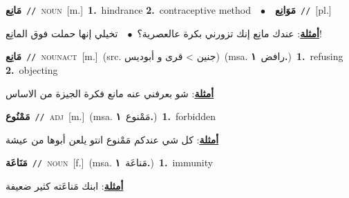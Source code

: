 \documentclass[10pt,a4paper,twoside]{article} %
\begin{document}
\begin{multicols}{2}
{\setlength\topsep{0pt}\textbf{\foreignlanguage{arabic}{مَانِع}}\ {\color{gray}\texttt{//}\color{black}}\ \textsc{noun}\ [m.]\ \textbf{1.}~hindrance  \textbf{2.}~contraceptive method\ \ $\bullet$\ \ \setlength\topsep{0pt}\textbf{\foreignlanguage{arabic}{مَوَانِع}}\ {\color{gray}\texttt{//}\color{black}}\ [pl.]\  \begin{flushright}\color{gray}\foreignlanguage{arabic}{\textbf{\underline{\foreignlanguage{arabic}{أمثلة}}}: عندك مانِع إنك تزورني بكرة عالعصرية؟\ $\bullet$\ \  تخيلي إنها حملت فوق المانِع!}\end{flushright}\color{black}} \vspace{2mm}

{\setlength\topsep{0pt}\textbf{\foreignlanguage{arabic}{مَانِع}}\ {\color{gray}\texttt{//}\color{black}}\ \textsc{noun\textunderscore act}\ [m.]\ (src. \color{gray}\foreignlanguage{arabic}{جنين > قرى و أبوديس}\color{black})\ \color{gray}(msa. \foreignlanguage{arabic}{رافض}~\foreignlanguage{arabic}{\textbf{١.}})\color{black}\ \textbf{1.}~refusing  \textbf{2.}~objecting\  \begin{flushright}\color{gray}\foreignlanguage{arabic}{\textbf{\underline{\foreignlanguage{arabic}{أمثلة}}}: شو بعرفني عنه مانع فكرة الجيزة من الاساس}\end{flushright}\color{black}} \vspace{2mm}

{\setlength\topsep{0pt}\textbf{\foreignlanguage{arabic}{مَمْنُوع}}\ {\color{gray}\texttt{//}\color{black}}\ \textsc{adj}\ [m.]\ \color{gray}(msa. \foreignlanguage{arabic}{مَمْنوع}~\foreignlanguage{arabic}{\textbf{١.}})\color{black}\ \textbf{1.}~forbidden\  \begin{flushright}\color{gray}\foreignlanguage{arabic}{\textbf{\underline{\foreignlanguage{arabic}{أمثلة}}}: كل شي عندكم مَمْنوع انتو يلعن أبوها من عيشة}\end{flushright}\color{black}} \vspace{2mm}

{\setlength\topsep{0pt}\textbf{\foreignlanguage{arabic}{مَنَاعَة}}\ {\color{gray}\texttt{//}\color{black}}\ \textsc{noun}\ [f.]\ \color{gray}(msa. \foreignlanguage{arabic}{مَناعَة}~\foreignlanguage{arabic}{\textbf{١.}})\color{black}\ \textbf{1.}~immunity\  \begin{flushright}\color{gray}\foreignlanguage{arabic}{\textbf{\underline{\foreignlanguage{arabic}{أمثلة}}}: ابنك مَناعَته كثير ضعيفة}\end{flushright}\color{black}} \vspace{2mm}


\end{multicols}
\end{document}
